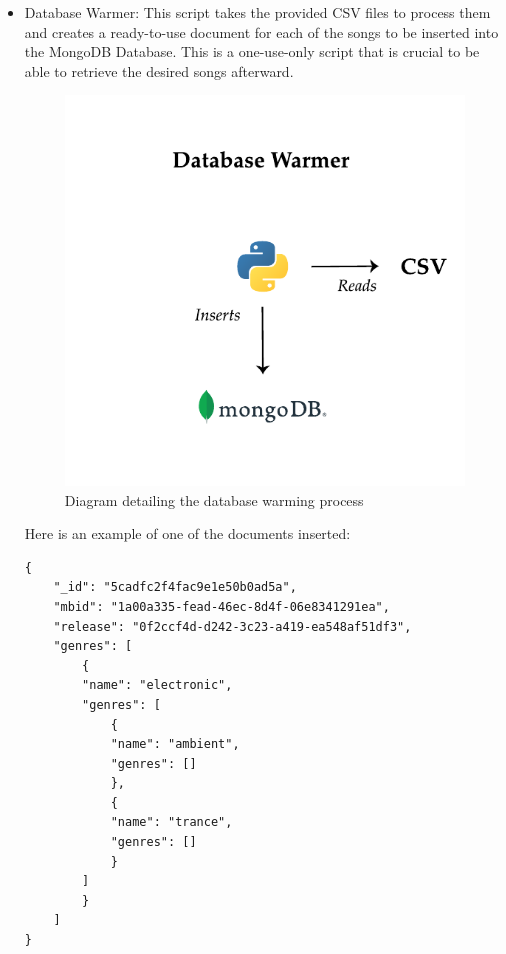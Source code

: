 \begin{itemize}
    \item Database Warmer: This script takes the provided CSV files to process them and creates a ready-to-use document for each of the songs to be inserted into the MongoDB Database. This is a one-use-only script that is crucial to be able to retrieve the desired songs afterward.
    \begin{figure}[th]
        \centering
        \includegraphics{Figures/DatabaseWarmer}
        \decoRule
        \caption[Database Warmer Script]{Diagram detailing the database warming process}
        \label{fig:Database Warmer Script}
    \end{figure}


    Here is an example of one of the documents inserted:
    \begin{lstlisting}[caption=Song JSON document]
{
    "_id": "5cadfc2f4fac9e1e50b0ad5a",
    "mbid": "1a00a335-fead-46ec-8d4f-06e8341291ea",
    "release": "0f2ccf4d-d242-3c23-a419-ea548af51df3",
    "genres": [
        {
        "name": "electronic",
        "genres": [
            {
            "name": "ambient",
            "genres": []
            },
            {
            "name": "trance",
            "genres": []
            }
        ]
        }
    ]
}
    \end{lstlisting}


\end{itemize}
